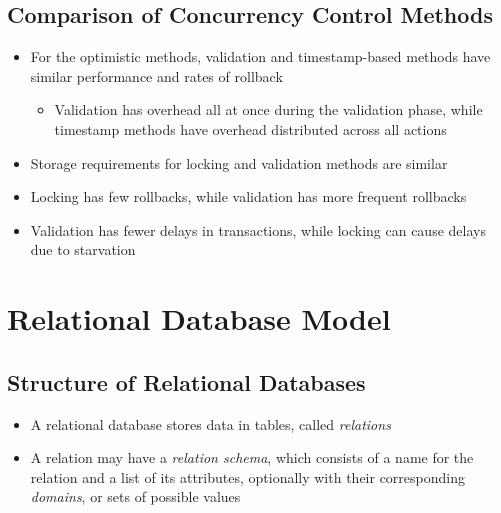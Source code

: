\documentclass[a4paper]{article}
\begin{document}
\subsection{Comparison of Concurrency Control Methods}
\begin{itemize}
\item For the optimistic methods, validation and timestamp-based methods have similar performance and rates of rollback
\begin{itemize}
\item Validation has overhead all at once during the validation phase, while timestamp methods have overhead distributed across all actions
\end{itemize}
\item Storage requirements for locking and validation methods are similar
\item Locking has few rollbacks, while validation has more frequent rollbacks
\item Validation has fewer delays in transactions, while locking can cause delays due to starvation
\end{itemize}

\section{Relational Database Model}
\subsection{Structure of Relational Databases}
\begin{itemize}
    \item A relational database stores data in tables, called \emph{relations}
    \item A relation may have a \emph{relation schema}, which consists of a name for the relation and a list of its attributes, optionally with their corresponding \emph{domains}, or sets of possible values
\end{itemize}
\end{document}

